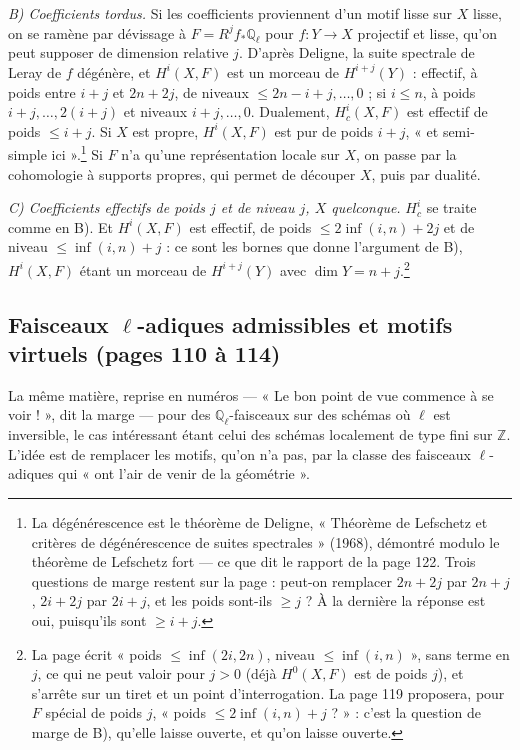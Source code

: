 \documentclass[11pt,a4paper]{article}
\begin{document}
\emph{B) Coefficients tordus.} Si les coefficients proviennent d'un motif lisse
sur $X$ lisse, on se ramène par dévissage à $F = R^{j}f_{*}\mathbb{Q}_{\ell}$ pour
$f \colon Y \to X$ projectif et lisse, qu'on peut supposer de dimension relative
$j$. D'après Deligne, la suite spectrale de Leray de $f$ dégénère, et $H^{i}(X, F)$
est un morceau de $H^{i+j}(Y)$ : effectif, à poids entre $i+j$ et $2n+2j$, de
niveaux $\leqslant 2n-i+j, \ldots, 0$ ; si $i \leqslant n$, à poids $i+j, \ldots,
2(i+j)$ et niveaux $i+j, \ldots, 0$. Dualement, $H^{i}_{c}(X, F)$ est effectif de
poids $\leqslant i+j$. Si $X$ est propre, $H^{i}(X, F)$ est pur de poids $i+j$, « et
semi-simple ici ».\footnote{La dégénérescence est le théorème de Deligne,
« Théorème de Lefschetz et critères de dégénérescence de suites spectrales »
(1968), démontré modulo le théorème de Lefschetz fort --- ce que dit le rapport
de la page 122. Trois questions de marge restent sur la page : peut-on remplacer
$2n+2j$ par $2n+j$, $2i+2j$ par $2i+j$, et les poids sont-ils $\geqslant j$ ? À la
dernière la réponse est oui, puisqu'ils sont $\geqslant i+j$.} Si $F$ n'a qu'une
représentation locale sur $X$, on passe par la cohomologie à supports propres,
qui permet de découper $X$, puis par dualité.

\emph{C) Coefficients effectifs de poids $j$ et de niveau $j$, $X$ quelconque.}
$H^{i}_{c}$ se traite comme en B). Et $H^{i}(X, F)$ est effectif, de poids
$\leqslant 2\inf(i, n) + 2j$ et de niveau $\leqslant \inf(i, n) + j$ : ce sont
les bornes que donne l'argument de B), $H^{i}(X, F)$ étant un morceau de
$H^{i+j}(Y)$ avec $\dim Y = n + j$.\footnote{La page écrit « poids $\leqslant
\inf(2i, 2n)$, niveau $\leqslant \inf(i, n)$ », sans terme en $j$, ce qui ne peut
valoir pour $j > 0$ (déjà $H^{0}(X, F)$ est de poids $j$), et s'arrête sur un
tiret et un point d'interrogation. La page 119 proposera, pour $F$ spécial de
poids $j$, « poids $\leqslant 2\inf(i,n) + j$ ? » : c'est la question de marge de
B), qu'elle laisse ouverte, et qu'on laisse ouverte.}

\subsection*{Faisceaux $\ell$-adiques admissibles et motifs virtuels (pages 110 à 114)}

La même matière, reprise en numéros --- « Le bon point de vue commence à se
voir ! », dit la marge --- pour des $\mathbb{Q}_{\ell}$-faisceaux sur des schémas
où $\ell$ est inversible, le cas intéressant étant celui des schémas localement
de type fini sur $\mathbb{Z}$. L'idée est de remplacer les motifs, qu'on n'a pas,
par la classe des faisceaux $\ell$-adiques qui « ont l'air de venir de la
géométrie ».
\end{document}
